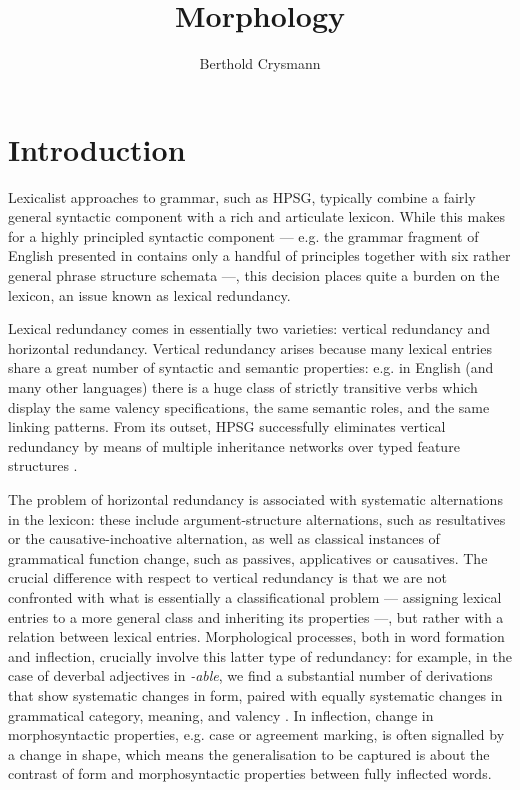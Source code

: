 \documentclass[output=paper
	        ,collection
	        ,collectionchapter
 	        ,biblatex
                ,babelshorthands
                ,newtxmath
                ,draftmode
                ,colorlinks, citecolor=brown
]{langscibook}
\author{Berthold Crysmann\affiliation{CNRS, Laboratoire de
    linguistique formelle, U Paris}
}
\title{Morphology}
\begin{document}
\maketitle

\label{chap-morphology}




\section{Introduction}
\label{morphology-sec:Intro}

Lexicalist approaches to grammar, such as HPSG, typically combine a
fairly general syntactic component with a rich and articulate
lexicon. While this makes for a highly principled syntactic
component --- e.g. the grammar fragment of English presented in
\citet{Pollard94} contains only a handful of principles together with
six rather general phrase structure schemata ---, this decision places
quite a burden on the lexicon, an issue  known as lexical
redundancy.

Lexical redundancy comes in essentially two varieties: vertical redundancy
and horizontal redundancy. Vertical redundancy arises because many
lexical entries share a great number of syntactic and semantic
properties: e.g. in English (and many other languages) there is a huge
class of strictly transitive verbs which display the same valency
specifications, the same semantic roles, and the same linking
patterns. From its outset, HPSG successfully eliminates vertical
redundancy by means of multiple inheritance networks over typed
feature structures \citep{Flickinger:Pollard:ea:85a}.

The problem of horizontal redundancy is associated with systematic
alternations in the lexicon: these include argument-structure
alternations, such as resultatives or the causative-inchoative
alternation, as well as classical instances of grammatical function
change, such as passives, applicatives or causatives. The crucial
difference with respect to vertical redundancy is that we are not
confronted with what is essentially a classificational problem ---
assigning lexical entries to a more general class and inheriting its
properties ---, but rather with a relation between lexical entries.
Morphological processes, both in word formation and inflection,
crucially involve this latter type of redundancy: for example, in the
case of deverbal adjectives in \textit{-able}, we find a substantial
number of derivations that show systematic changes in form, paired
with equally systematic changes in grammatical category, meaning, and
valency \citep{Riehemann98}. In inflection, change in morphosyntactic
properties, e.g. case or agreement marking, is often signalled by a
change in shape, which means the generalisation to be captured is about the
contrast of form and morphosyntactic properties between fully
inflected words.
\end{document}

